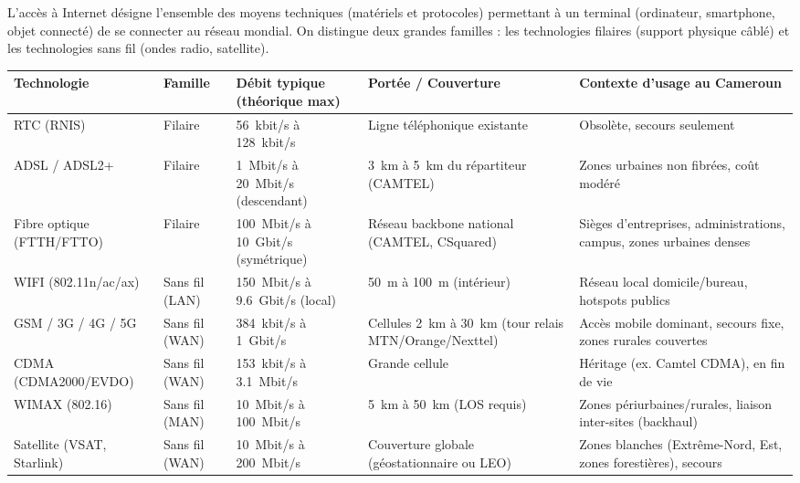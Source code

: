 \documentclass[11pt]{article}
\newcommand{\cle}[1]{{\popxbold\color{popdark}#1}}
\newcounter{popsec}
\newcounter{popsub}
\newcommand{\courssub}[1]{%
  \stepcounter{popsub}%
  \par\vspace{9pt}\noindent{\popxbold\fontsize{11.5}{13}\selectfont\color{popink}{\color{poporange}\thepopsec.\thepopsub}\hspace{6pt}#1}\par\nopagebreak\vspace{4pt}
}
\begin{document}
\courssub{Technologies d'accès à Internet}

\begin{definition}
L'accès à Internet désigne l'ensemble des moyens techniques (matériels et protocoles) permettant à un terminal (ordinateur, smartphone, objet connecté) de se connecter au réseau mondial. On distingue deux grandes familles : les technologies \cle{filaires} (support physique câblé) et les technologies \cle{sans fil} (ondes radio, satellite).
\end{definition}

\begin{propriete}
\begin{center}
\begin{tabularx}{\linewidth}{|l|X|X|X|X|}
\hline
\rowcolor{popblueL}
\textbf{Technologie} & \textbf{Famille} & \textbf{Débit typique (théorique max)} & \textbf{Portée / Couverture} & \textbf{Contexte d'usage au Cameroun} \\
\hline
RTC (RNIS) & Filaire & \SI{56}{kbit/s} à \SI{128}{kbit/s} & Ligne téléphonique existante & Obsolète, secours seulement \\
ADSL / ADSL2+ & Filaire & \SI{1}{Mbit/s} à \SI{20}{Mbit/s} (descendant) & \SI{3}{km} à \SI{5}{km} du répartiteur (CAMTEL) & Zones urbaines non fibrées, coût modéré \\
Fibre optique (FTTH/FTTO) & Filaire & \SI{100}{Mbit/s} à \SI{10}{Gbit/s} (symétrique) & Réseau backbone national (CAMTEL, CSquared) & Sièges d'entreprises, administrations, campus, zones urbaines denses \\
WIFI (802.11n/ac/ax) & Sans fil (LAN) & \SI{150}{Mbit/s} à \SI{9,6}{Gbit/s} (local) & \SI{50}{m} à \SI{100}{m} (intérieur) & Réseau local domicile/bureau, hotspots publics \\
GSM / 3G / 4G / 5G & Sans fil (WAN) & \SI{384}{kbit/s} à \SI{1}{Gbit/s} & Cellules \SI{2}{km} à \SI{30}{km} (tour relais MTN/Orange/Nexttel) & Accès mobile dominant, secours fixe, zones rurales couvertes \\
CDMA (CDMA2000/EVDO) & Sans fil (WAN) & \SI{153}{kbit/s} à \SI{3,1}{Mbit/s} & Grande cellule & Héritage (ex. Camtel CDMA), en fin de vie \\
WIMAX (802.16) & Sans fil (MAN) & \SI{10}{Mbit/s} à \SI{100}{Mbit/s} & \SI{5}{km} à \SI{50}{km} (LOS requis) & Zones périurbaines/rurales, liaison inter-sites (backhaul) \\
Satellite (VSAT, Starlink) & Sans fil (WAN) & \SI{10}{Mbit/s} à \SI{200}{Mbit/s} & Couverture globale (géostationnaire ou LEO) & Zones blanches (Extrême-Nord, Est, zones forestières), secours \\
\hline
\end{tabularx}
\end{center}
\end{propriete}
\end{document}
